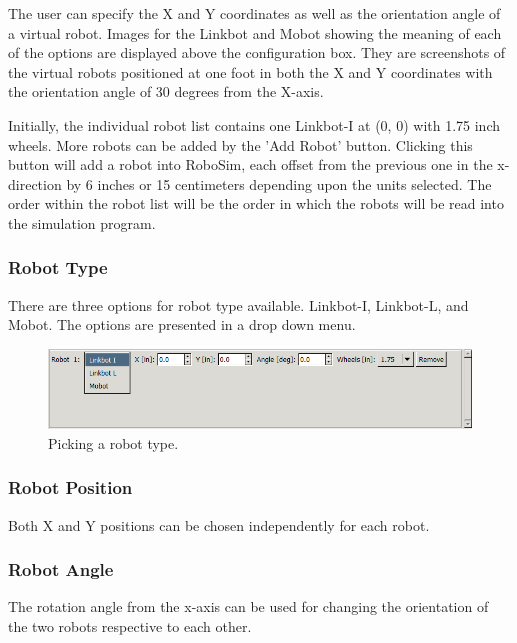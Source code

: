 \documentclass{article}
\begin{document}
The user can specify the X and Y coordinates  as well as the orientation angle
of a virtual robot.  Images for the Linkbot and Mobot showing the meaning of
each of the options are displayed above the configuration box.  They are
screenshots of the virtual robots positioned at one foot in both the X and Y
coordinates with the orientation angle of 30 degrees from the X-axis.

Initially, the individual robot list contains one Linkbot-I at (0, 0) with 1.75
inch wheels.  More robots can be added by the 'Add Robot' button.  Clicking this
button will add a robot into RoboSim, each offset from the previous one in the
x-direction by 6 inches or 15 centimeters depending upon the units selected.
The order within the robot list will be the order in which the robots will be
read into the simulation program.

\subsubsection{Robot Type}
There are three options for robot type available.  Linkbot-I, Linkbot-L,
and Mobot.  The options are presented in a drop down menu.
\begin{figure}[H]
	\begin{center}
		\includegraphics[width=6in]{images/gui_type}
	\end{center}
	\caption{Picking a robot type.}
	\label{fig:type}
\end{figure}

\subsubsection{Robot Position}
Both X and Y positions can be chosen independently for each robot.

\subsubsection{Robot Angle}
The rotation angle from the x-axis can be used for changing the orientation of
the two robots respective to each other.
\end{document}
